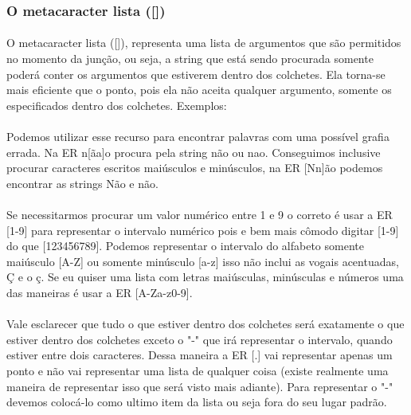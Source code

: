 \documentclass[10pt,a4paper]{article}
\begin{document}
\subsubsection{O metacaracter lista ([])}
\paragraph*{}
O metacaracter lista ([]), representa uma lista de argumentos que são permitidos no momento da junção, ou seja, a string que está sendo procurada somente poderá conter os argumentos que estiverem dentro dos colchetes. Ela torna-se mais eficiente que o ponto, pois ela não aceita qualquer argumento, somente os especificados dentro dos colchetes.
Exemplos: 
\paragraph*{}
Podemos utilizar esse recurso para encontrar palavras com uma possível grafia errada. Na ER n[ãa]o procura pela string não ou nao. 
Conseguimos inclusive procurar caracteres escritos maiúsculos e minúsculos, na ER [Nn]ão podemos encontrar as strings Não e não.
\paragraph*{}
Se necessitarmos procurar um valor numérico entre 1 e 9 o correto é usar a ER [1-9] para representar o intervalo numérico pois e bem mais cômodo digitar [1-9] do que [123456789]. Podemos representar o intervalo do alfabeto somente maiúsculo [A-Z] ou somente minúsculo [a-z] isso não inclui as vogais acentuadas, Ç e o ç. Se eu quiser uma lista com letras maiúsculas, minúsculas e números uma das maneiras é usar a ER [A-Za-z0-9].
\paragraph*{}
Vale esclarecer que tudo o que estiver dentro dos colchetes será exatamente o que estiver dentro dos colchetes exceto o "-" que irá representar o intervalo, quando estiver entre dois caracteres. Dessa maneira a ER [.] vai representar apenas um ponto e não vai representar uma lista de qualquer coisa (existe realmente uma maneira de representar isso que será visto mais adiante). Para representar o "-" devemos colocá-lo como ultimo item da lista ou seja fora do seu lugar padrão.
\end{document}
